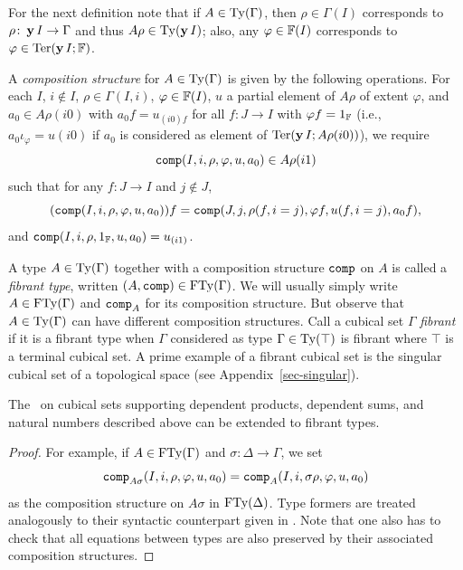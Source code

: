 For the next definition note that if $A \in \operatorname{Ty} (\Gamma)$, then $\rho
\in \Gamma(I)$ corresponds to $\rho \colon \operatorname{\mathbf{y}} I \to \Gamma$ and
thus $A \rho \in \operatorname{Ty}(\operatorname{\mathbf{y}} I)$; also, any $\varphi \in \mathbb{F}(I)$
corresponds to $\varphi \in \operatorname{Ter}(\operatorname{\mathbf{y}} I;\mathbb{F})$.

\begin{definition}
  \label{def:comp-struct}
  A \emph{composition structure} for $A \in \operatorname{Ty} (\Gamma)$ is given by
  the following operations.  For each $I$, $i \notin I$, $\rho \in
  \Gamma (I,i)$, $\varphi \in \mathbb{F}(I)$, $u$ a partial element of $A
  \rho$ of extent $\varphi$, and $a_0 \in A \rho (i0)$ with $a_0 f =
  u_{(i0) f}$ for all $f \colon J \to I$ with $\varphi f = 1_{\mathbb{F}}$
  (i.e., $a_0 \iota_\varphi = u (i0) $ if $a_0$ is considered as
  element of $\operatorname{Ter} (\operatorname{\mathbf{y}} I; A \rho (i0))$), we require
  \[
  \operatorname{\mathtt{comp}} (I,i,\rho,\varphi,u,a_0) \in A \rho (i1)
  \]
  such that for any $f \colon J \to I$ and $j \notin J$,
  \begin{equation*}
    (\scomp (I,i,\rho,\varphi,u,a_0)) f = %
    \scomp (J,j,\rho (f,i=j),\varphi f,u (f,i=j),a_0 f),
  \end{equation*}
  and $\operatorname{\mathtt{comp}} (I,i,\rho,1_{\mathbb{F}},u,a_0) = u_{(i1)}$.
\end{definition}

A type $A \in \operatorname{Ty}(\Gamma)$ together with a composition structure
$\operatorname{\mathtt{comp}}$ on $A$ is called a \emph{fibrant type}, written
$(A,\operatorname{\mathtt{comp}}) \in \operatorname{FTy}(\Gamma)$.  We will usually simply write
$A \in \operatorname{FTy}(\Gamma)$ and $\operatorname{\mathtt{comp}}_A$ for its composition structure.
But observe that $A \in \operatorname{Ty}(\Gamma)$ can have different composition
structures. Call a cubical set $\Gamma$ \emph{fibrant} if it is a
fibrant type when $\Gamma$ considered as type $\Gamma \in \operatorname{Ty} (\top)$
is fibrant where $\top$ is a terminal cubical set.  A prime example of
a fibrant cubical set is the singular cubical set of a topological
space (see Appendix~\ref{sec-singular}).

\begin{theorem}
  \label{thm:1}
  The \cwf\ on cubical sets supporting dependent products, dependent sums,
  and natural numbers described above can be extended to fibrant types.
\end{theorem}
\begin{proof}
  For example, if $A \in \operatorname{FTy} (\Gamma)$ and $\sigma \colon \Delta \to
  \Gamma$, we set
  \[
  \operatorname{\mathtt{comp}}_{A \sigma} (I,i,\rho,\varphi,u,a_0) = \operatorname{\mathtt{comp}}_A (I,i,\sigma
  \rho,\varphi,u,a_0)
  \]
  as the composition structure on $A \sigma$ in $\operatorname{FTy}(\Delta)$.  Type
  formers are treated analogously to their syntactic counterpart given
  in . Note that one also has to check that all
  equations between types are also preserved by their associated
  composition structures.
\end{proof}

